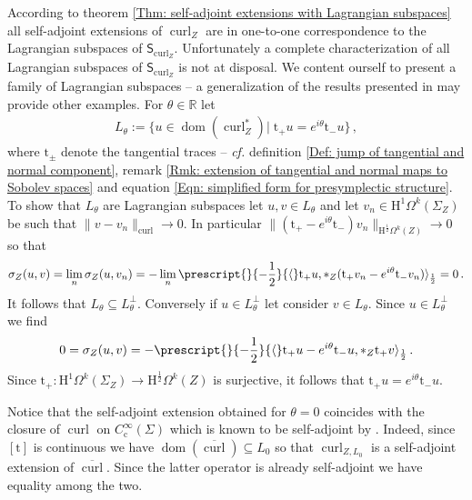 \begin{Example}
	According to theorem \ref{Thm: self-adjoint extensions with Lagrangian subspaces} all self-adjoint extensions of $\operatorname{curl}_Z$ are in one-to-one correspondence to the Lagrangian subspaces of $\mathsf{S}_{\operatorname{curl}_Z}$.
	Unfortunately a complete characterization of all Lagrangian subspaces of $\mathsf{S}_{\operatorname{curl}_Z}$ is not at disposal.
	We content ourself to present a family of Lagrangian subspaces -- a generalization of the results presented in \cite{Hiptmair-Kotiuga-Tordeux-12} may provide other examples.
	For $\theta\in\mathbb{R}$ let
	\begin{align}
		L_{\theta}:=\lbrace
		u\in\operatorname{dom}(\operatorname{curl}_Z^*)|\;\mathrm{t}_+u=e^{i\theta}\mathrm{t}_-u\rbrace\,,
	\end{align}
	where $\mathrm{t}_\pm$ denote the tangential traces -- \textit{cf.} definition \ref{Def: jump of tangential and normal component}, remark \ref{Rmk: extension of tangential and normal maps to Sobolev spaces} and equation \eqref{Eqn: simplified form for presymplectic structure}.
	To show that $L_\theta$ are Lagrangian subspaces let $u,v\in L_\theta$ and let $v_n\in\mathrm{H}^1\Omega^k(\Sigma_Z)$ be such that $\|v-v_n\|_{\operatorname{curl}}\to 0$.
	In particular $\|(\mathrm{t}_+-e^{i\theta}\mathrm{t}_-) v_n\|_{\mathrm{H}^{\frac{1}{2}}\Omega^k(Z)}\to 0$ so that
	\begin{align}
		\sigma_Z(u,v)=
		\lim_n\sigma_Z(u,v_n)=
		-\lim_n
		\prescript{}{-\frac{1}{2}}{\langle}\mathrm{t}_+u,\ast_Z(\mathrm{t}_+v_n-e^{i\theta}\mathrm{t}_-v_n)\rangle_{\frac{1}{2}}=0\,.
	\end{align}
	It follows that $L_\theta\subseteq L_\theta^\perp$.
	Conversely if $u\in L_\theta^\perp$ let consider $v\in L_\theta$.
	Since $u\in L_\theta^\perp$ we find
	\begin{align*}
		0=\sigma_Z(u,v)=
		-\prescript{}{-\frac{1}{2}}{\langle}\mathrm{t}_+u-e^{i\theta}\mathrm{t}_-u,\ast_Z\mathrm{t}_+v\rangle_{\frac{1}{2}}\,.	
	\end{align*}
	Since $\mathrm{t}_+\colon\mathrm{H}^1\Omega^k(\Sigma_Z)\to \mathrm{H}^{\frac12}\Omega^k(Z)$ is surjective, it follows that $\mathrm{t}_+u=e^{i\theta}\mathrm{t}_-u$.

	Notice that the self-adjoint extension obtained for $\theta=0$ coincides with the closure of $\operatorname{curl}$ on $C^\infty_{\mathrm{c}}(\Sigma)$ which is known to be self-adjoint by \cite[Lem. 2.6]{Baer-19}.
	Indeed, since $[\mathrm{t}]$ is continuous we have $\operatorname{dom}(\overline{\operatorname{curl}})\subseteq L_{0}$ so that $\operatorname{curl}_{Z,L_0}$ is a self-adjoint extension of $\overline{\operatorname{curl}}$.
	Since the latter operator is already self-adjoint we have equality among the two.
\end{Example}

